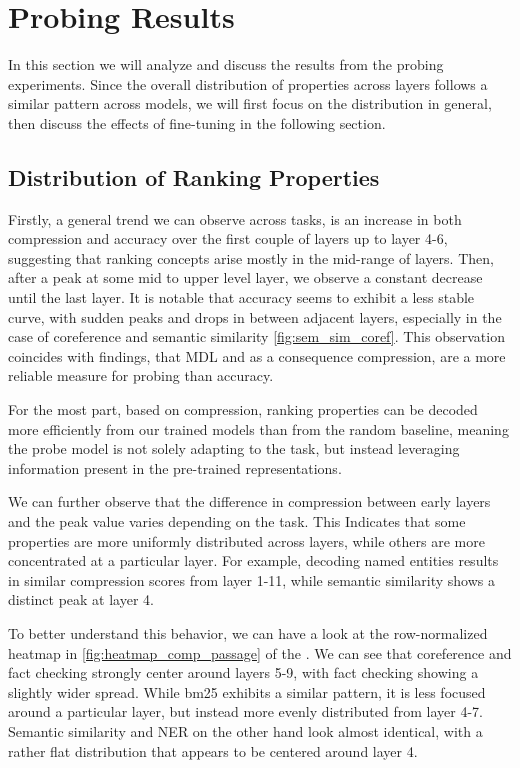 \chapter{Probing Results}
\label{chap:results}
In this section we will analyze and discuss the results from the probing experiments. Since the overall distribution of properties across layers follows a similar pattern across models, we will first focus on the distribution in general, then discuss the effects of fine-tuning in the following section.

\section{Distribution of Ranking Properties}
Firstly, a general trend we can observe across tasks, is an increase in both compression and accuracy over the first couple of layers up to layer 4-6, suggesting that ranking concepts arise mostly in the mid-range of layers. Then, after a peak at some mid to upper level layer, we observe a constant decrease until the last layer. It is notable that accuracy seems to exhibit a less stable curve, with sudden peaks and drops in between adjacent layers, especially in the case of coreference and semantic similarity \autoref{fig:sem_sim_coref}. This observation coincides with \cite{voita-titov-2020-information} findings, that MDL and as a consequence compression, are a more reliable measure for probing than accuracy.

For the most part, based on compression, ranking properties can be decoded more efficiently from our trained models than from the random baseline, meaning the probe model is not solely adapting to the task, but instead leveraging information present in the pre-trained representations.

We can further observe that the difference in compression between early layers and the peak value varies depending on the task. This Indicates that some properties are more uniformly distributed across layers, while others are more concentrated at a particular layer. For example, decoding named entities results in similar compression scores from layer 1-11, while semantic similarity shows a distinct peak at layer 4.

To better understand this behavior, we can have a look at the row-normalized heatmap in \autoref{fig:heatmap_comp_passage} of the . We can see that coreference and fact checking strongly center around layers 5-9, with fact checking showing a slightly wider spread. While bm25 exhibits a similar pattern, it is less focused around a particular layer, but instead more evenly distributed from layer 4-7. Semantic similarity and NER on the other hand look almost identical, with a rather flat distribution that appears to be centered around layer 4.

